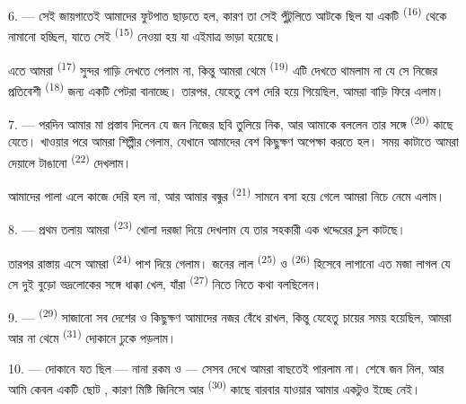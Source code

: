 6. --- সেই জায়গাতেই আমাদের ফুটপাত ছাড়তে হল, কারণ তা সেই পুঁটুলিতে আটকে ছিল
যা একটি  \textsuperscript{(16)} থেকে নামানো হচ্ছিল,
যাতে সেই  \textsuperscript{(15)} নেওয়া হয় যা এইমাত্র ভাড়া
হয়েছে।

এতে আমরা  \textsuperscript{(17)} সুন্দর গাড়ি দেখতে
পেলাম না, কিন্তু আমরা থেমে  \textsuperscript{(19)} এটি দেখতে
থামলাম না যে সে নিজের প্রতিবেশী 
\textsuperscript{(18)} জন্য একটি পেটরা বানাচ্ছে। তারপর, যেহেতু বেশ দেরি হয়ে
গিয়েছিল, আমরা বাড়ি ফিরে এলাম।

\VUsaut{3.0mm}

7. --- পরদিন আমার মা প্রস্তাব দিলেন যে জন নিজের ছবি তুলিয়ে নিক, আর আমাকে
বললেন তার সঙ্গে  \textsuperscript{(20)} কাছে যেতে। খাওয়ার
পরে আমরা শিল্পীর  গেলাম, যেখানে আমাদের বেশ কিছুক্ষণ অপেক্ষা করতে
হল। সময় কাটাতে আমরা দেয়ালে টাঙানো  \textsuperscript{(22)}
দেখলাম।

আমাদের পালা এলে কাজে দেরি হল না, আর আমার বন্ধুর 
\textsuperscript{(21)} সামনে বসা হয়ে গেলে আমরা নিচে নেমে এলাম।

8. --- প্রথম তলায় আমরা  \textsuperscript{(23)} খোলা দরজা দিয়ে
দেখলাম যে তার সহকারী এক খদ্দেরের চুল কাটছে।

তারপর রাস্তায় এসে আমরা  \textsuperscript{(24)} পাশ দিয়ে
গেলাম। জনের লাল  \textsuperscript{(25)} ও 
\textsuperscript{(26)} হিসেবে লাগানো  এত মজা লাগল যে সে দুই
বুড়ো ভদ্রলোকের সঙ্গে ধাক্কা খেল, যাঁরা 
\textsuperscript{(27)} নিতে নিতে কথা বলছিলেন।

\VUsaut{3.0mm}

9. ---  \textsuperscript{(29)}  সাজানো সব
দেশের  ও  কিছুক্ষণ আমাদের নজর বেঁধে রাখল, কিন্তু
যেহেতু চায়ের সময় হয়েছিল, আমরা আর না থেমে 
\textsuperscript{(31)} দোকানে ঢুকে পড়লাম।

10. --- দোকানে যত  ছিল --- নানা রকম  ও  --- সেসব দেখে আমরা বাছতেই পারলাম না।
শেষে জন  নিল, আর আমি কেবল একটি ছোট ,
কারণ মিষ্টি জিনিসে  আর
 \textsuperscript{(30)} কাছে বারবার যাওয়ার আমার একটুও
ইচ্ছে নেই।

